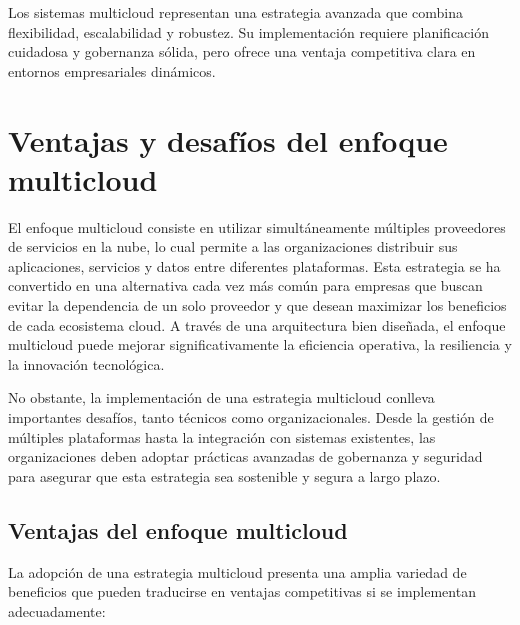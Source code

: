 {        Los sistemas multicloud representan una estrategia avanzada que combina flexibilidad, escalabilidad y robustez. Su implementación requiere planificación cuidadosa y gobernanza sólida, pero ofrece una ventaja competitiva clara en entornos empresariales dinámicos.
    
    \section{Ventajas y desafíos del enfoque multicloud}
        El enfoque multicloud consiste en utilizar simultáneamente múltiples proveedores de servicios en la nube, lo cual permite a las organizaciones distribuir sus aplicaciones, servicios y datos entre diferentes plataformas. Esta estrategia se ha convertido en una alternativa cada vez más común para empresas que buscan evitar la dependencia de un solo proveedor y que desean maximizar los beneficios de cada ecosistema cloud. A través de una arquitectura bien diseñada, el enfoque multicloud puede mejorar significativamente la eficiencia operativa, la resiliencia y la innovación tecnológica.
        
        No obstante, la implementación de una estrategia multicloud conlleva importantes desafíos, tanto técnicos como organizacionales. Desde la gestión de múltiples plataformas hasta la integración con sistemas existentes, las organizaciones deben adoptar prácticas avanzadas de gobernanza y seguridad para asegurar que esta estrategia sea sostenible y segura a largo plazo.
        
        \subsection{Ventajas del enfoque multicloud}
            La adopción de una estrategia multicloud presenta una amplia variedad de beneficios que pueden traducirse en ventajas competitivas si se implementan adecuadamente:
        
}
